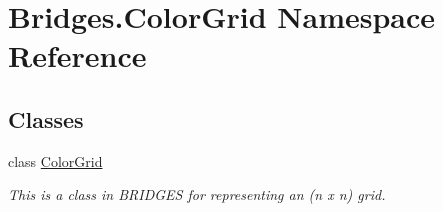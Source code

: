 \hypertarget{namespace_bridges_1_1_color_grid}{}\section{Bridges.\+Color\+Grid Namespace Reference}
\label{namespace_bridges_1_1_color_grid}
\subsection*{Classes}
\begin{DoxyCompactItemize}
\item 
class \mbox{\hyperlink{class_bridges_1_1_color_grid_1_1_color_grid}{Color\+Grid}}
\begin{DoxyCompactList}\small\item\em This is a class in B\+R\+I\+D\+G\+ES for representing an (n x n) grid. \end{DoxyCompactList}\end{DoxyCompactItemize}
